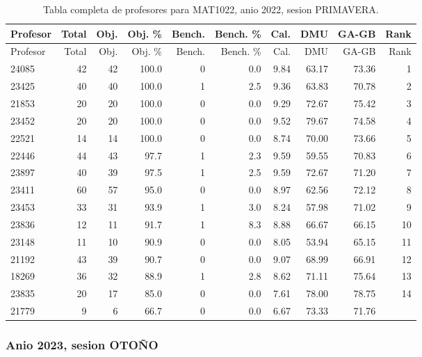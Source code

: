 \begingroup
\scriptsize
\setlength{\tabcolsep}{3pt}
\begin{longtable}{lrrrrrrrrr}
\caption{Tabla completa de profesores para MAT1022, anio 2022, sesion PRIMAVERA.}\label{tab:prof-period-mat1022-2022-primavera-especializado}\\
\toprule
Profesor & Total & Obj. & Obj. \% & Bench. & Bench. \% & Cal. & DMU & GA-GB & Rank \\
\midrule
\endfirsthead
\toprule
Profesor & Total & Obj. & Obj. \% & Bench. & Bench. \% & Cal. & DMU & GA-GB & Rank \\
\midrule
\endhead
24085 & 42 & 42 & 100.0 & 0 & 0.0 & 9.84 & 63.17 & 73.36 & 1 \\
23425 & 40 & 40 & 100.0 & 1 & 2.5 & 9.36 & 63.83 & 70.78 & 2 \\
21853 & 20 & 20 & 100.0 & 0 & 0.0 & 9.29 & 72.67 & 75.42 & 3 \\
23452 & 20 & 20 & 100.0 & 0 & 0.0 & 9.52 & 79.67 & 74.58 & 4 \\
22521 & 14 & 14 & 100.0 & 0 & 0.0 & 8.74 & 70.00 & 73.66 & 5 \\
22446 & 44 & 43 & 97.7 & 1 & 2.3 & 9.59 & 59.55 & 70.83 & 6 \\
23897 & 40 & 39 & 97.5 & 1 & 2.5 & 9.59 & 72.67 & 71.20 & 7 \\
23411 & 60 & 57 & 95.0 & 0 & 0.0 & 8.97 & 62.56 & 72.12 & 8 \\
23453 & 33 & 31 & 93.9 & 1 & 3.0 & 8.24 & 57.98 & 71.02 & 9 \\
23836 & 12 & 11 & 91.7 & 1 & 8.3 & 8.88 & 66.67 & 66.15 & 10 \\
23148 & 11 & 10 & 90.9 & 0 & 0.0 & 8.05 & 53.94 & 65.15 & 11 \\
21192 & 43 & 39 & 90.7 & 0 & 0.0 & 9.07 & 68.99 & 66.91 & 12 \\
18269 & 36 & 32 & 88.9 & 1 & 2.8 & 8.62 & 71.11 & 75.64 & 13 \\
23835 & 20 & 17 & 85.0 & 0 & 0.0 & 7.61 & 78.00 & 78.75 & 14 \\
21779 & 9 & 6 & 66.7 & 0 & 0.0 & 6.67 & 73.33 & 71.76 &  \\
\bottomrule
\end{longtable}
\endgroup

\subsubsection{Anio 2023, sesion OTOÑO}

